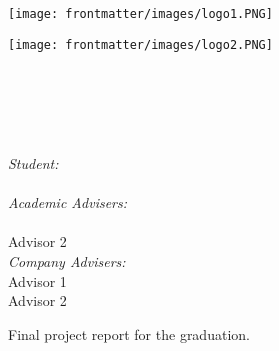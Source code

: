\begin{titlepage}
\begin{center}
    
	\begin{minipage}{0.48\textwidth} \begin{flushleft}
    \texttt{[image: frontmatter/images/logo1.PNG]}
    \end{flushleft}\end{minipage}
    \begin{minipage}{0.48\textwidth} \begin{flushright}
    \texttt{[image: frontmatter/images/logo2.PNG]}
     \end{flushright}\end{minipage}
     
    \vspace*{1.5cm}

    \textsc{\LARGE \myuniversity}\\[0.2cm]
    \textsc{\large \myschool}\\[1.5cm]
    
    
    \vspace*{1cm}

  { \huge \bfseries \thetitle }\\[0.4cm]	
    \vspace*{2cm}
  
  { \large 
    \emph{Student:} \\	
      {\theauthor} \\
    \vspace*{0.5cm}
    \emph{Academic Advisers:} \\													  
      \myadvisorA \\
      Advisor 2	\\
    \vspace*{0.5cm}
    \emph{Company Advisers:} \\													  
      Advisor 1 \\
      Advisor 2	\\
  }

  \vspace{2cm}
    Final project report for the \mygrade \: graduation.	\\	

  \vspace{3cm} 	
  \begin{center}
    {\thedate}
  \end{center}
 
    
\end{center}
\end{titlepage}